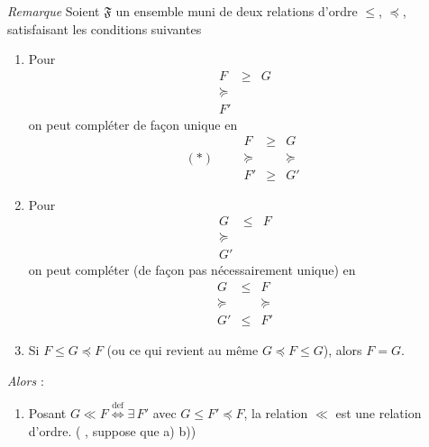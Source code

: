 \documentclass[11pt,a4paper]{article}
\begin{document}
\emph{Remarque} \quad Soient $\mathfrak{F}$  un ensemble muni de deux relations d'ordre $\leq$, $\preccurlyeq$, satisfaisant les conditions suivantes
\begin{enumerate}
  \item[a)] Pour
  \[
    \begin{array}{ccc}
      F & \geq & G \\
      \succcurlyeq & & \\
      F' & &
    \end{array}
  \]
  on peut compléter de façon unique en
  \[
    (*) \qquad
    \begin{array}{ccc}
      F & \geq & G \\
      \succcurlyeq & & \succcurlyeq \\
      F' & \geq & G'
    \end{array}
  \]
  \item[b)] Pour
  \[
    \begin{array}{ccc}
      G & \leq & F \\
      \succcurlyeq & & \\
      G' & &
    \end{array}
  \]
  on peut compléter (de façon pas nécessairement unique) en
  \[
    \begin{array}{ccc}
      G & \leq & F \\
      \succcurlyeq & & \succcurlyeq \\
      G' & \leq & F'
    \end{array}
  \]
  \item[c)] Si $F \leq G \preccurlyeq F$ (ou ce qui revient au même $G \preccurlyeq F \leq G$), alors $F = G$.
\end{enumerate}

\emph{Alors} : 
\begin{enumerate}
  \item[(i)] Posant $G \ll F \overset{\mathrm{def}}{\Longleftrightarrow} \exists\, F'$ avec $G \leq F' \preccurlyeq F$, la relation $\ll$ est une relation d'ordre. (\ill{} \ill{}, \ill{} \ill{} suppose que a) b))
\end{enumerate}
\end{document}
